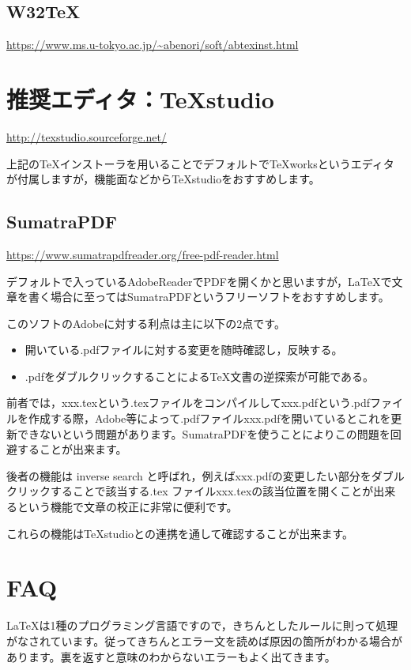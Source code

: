 \documentclass[10pt,a4paper,oneside,twocolumn,fleqn,dvipdfmx]{jsarticle}
\begin{document}
\subsection{W32TeX}
\url{https://www.ms.u-tokyo.ac.jp/~abenori/soft/abtexinst.html}

\section{推奨エディタ：TeXstudio}
\url{http://texstudio.sourceforge.net/}

上記のTeXインストーラを用いることでデフォルトでTeXworksというエディタが付属しますが，機能面などからTeXstudioをおすすめします。

\subsection{SumatraPDF}
\url{https://www.sumatrapdfreader.org/free-pdf-reader.html}

デフォルトで入っているAdobeReaderでPDFを開くかと思いますが，LaTeXで文章を書く場合に至ってはSumatraPDFというフリーソフトをおすすめします。

このソフトのAdobeに対する利点は主に以下の2点です。
\begin{itemize}
	\item 開いている.pdfファイルに対する変更を随時確認し，反映する。
	\item .pdfをダブルクリックすることによる\TeX 文書の逆探索が可能である。
\end{itemize}
前者では，xxx.texという.texファイルをコンパイルしてxxx.pdfという.pdfファイルを作成する際，Adobe等によって.pdfファイルxxx.pdfを開いているとこれを更新できないという問題があります。SumatraPDFを使うことによりこの問題を回避することが出来ます。

後者の機能は inverse search と呼ばれ，例えばxxx.pdfの変更したい部分をダブルクリックすることで該当する.tex ファイルxxx.texの該当位置を開くことが出来るという機能で文章の校正に非常に便利です。

これらの機能はTeXstudioとの連携を通して確認することが出来ます。

\section{FAQ}

\LaTeX は1種のプログラミング言語ですので，きちんとしたルールに則って処理がなされています。従ってきちんとエラー文を読めば原因の箇所がわかる場合があります。裏を返すと意味のわからないエラーもよく出てきます。
\end{document}
